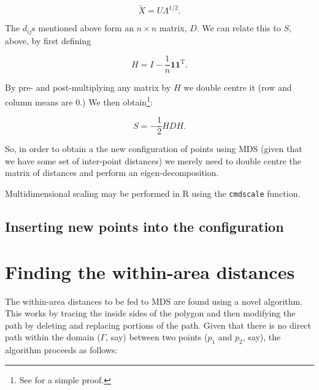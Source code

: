 \documentclass[a4paper,10pt]{amsart}
\newcommand{\tr}[1]{#1^{\text{T}}}
\begin{document}
\begin{equation}
\tilde{X}=U\Lambda^{1/2}.
\end{equation}

The $d_{ij}$s mentioned above form an $n \times n$ matrix, $D$. We can relate this to $S$, above, by first defining

\begin{equation}
H = I-\frac{1}{n}\mathbf{1}\tr{\mathbf{1}}.
\end{equation}

By pre- and post-multiplying any matrix by $H$ we double centre it (row and column means are 0.) We then obtain\footnote{See \cite{diaconis08} for a simple proof.}:

\begin{equation}
S = -\frac{1}{2}HDH.
\end{equation}

So, in order to obtain a the new configuration of points using MDS (given that we have some set of inter-point distances) we merely need to double centre the matrix of distances and perform an eigen-decomposition.

Multidimensional scaling may be performed in \textsf{R} using the \texttt{cmdscale} function. 

\subsection{Inserting new points into the configuration}




\section{Finding the within-area distances}

The within-area distances to be fed to MDS are found using a novel algorithm. This works by tracing the inside sides of the polygon and then modifying the path by deleting and replacing portions of the path. Given that there is no direct path within the domain ($\Gamma$, say) between two points ($p_1$ and $p_2$, say), the algorithm proceeds as follows:
\end{document}
